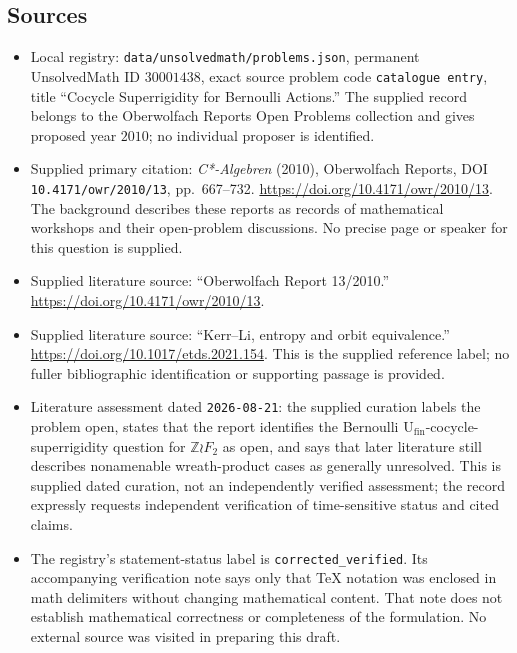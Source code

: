 \documentclass[11pt]{article}
\begin{document}
\subsection{Sources}
\begin{itemize}
\item Local registry: \texttt{data/unsolvedmath/problems.json}, permanent UnsolvedMath ID \(30001438\), exact source problem code \texttt{catalogue entry}, title ``Cocycle Superrigidity for Bernoulli Actions.'' The supplied record belongs to the Oberwolfach Reports Open Problems collection and gives proposed year \(2010\); no individual proposer is identified.
\item Supplied primary citation: \emph{C*-Algebren} (2010), Oberwolfach Reports, DOI \texttt{10.4171/owr/2010/13}, pp.\ 667--732. \url{https://doi.org/10.4171/owr/2010/13}. The background describes these reports as records of mathematical workshops and their open-problem discussions. No precise page or speaker for this question is supplied.
\item Supplied literature source: ``Oberwolfach Report 13/2010.'' \url{https://doi.org/10.4171/owr/2010/13}.
\item Supplied literature source: ``Kerr--Li, entropy and orbit equivalence.'' \url{https://doi.org/10.1017/etds.2021.154}. This is the supplied reference label; no fuller bibliographic identification or supporting passage is provided.
\item Literature assessment dated \texttt{2026-08-21}: the supplied curation labels the problem open, states that the report identifies the Bernoulli \(\mathrm{U}_{\mathrm{fin}}\)-cocycle-superrigidity question for \(\mathbb Z\wr F_2\) as open, and says that later literature still describes nonamenable wreath-product cases as generally unresolved. This is supplied dated curation, not an independently verified assessment; the record expressly requests independent verification of time-sensitive status and cited claims.
\item The registry's statement-status label is \texttt{corrected\_verified}. Its accompanying verification note says only that TeX notation was enclosed in math delimiters without changing mathematical content. That note does not establish mathematical correctness or completeness of the formulation. No external source was visited in preparing this draft.
\end{itemize}
\end{document}
